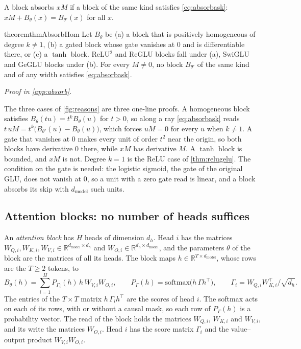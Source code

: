 \documentclass[10pt]{article}
\theoremstyle{definition}
\theoremstyle{remark}
\newcommand{\R}{\mathbb{R}}
\newcommand{\dm}{d_{\mathrm{model}}}
\newcommand{\proofin}[1]{\par\vspace{-0.4\baselineskip}\noindent\hfill{\small\itshape Proof in \cref{#1}.}\par\smallskip}
\begin{document}
A block absorbs $xM$ if a block of the same kind satisfies \eqref{eq:absorbask}: $xM + B_\theta(x) = B_{\theta'}(x)$ for all $x$.

\begin{restatable}{theorem}{thmAbsorbHom}\label{thm:homgated}
Let $B_\theta$ be (a) a block that is positively homogeneous of degree $k \neq 1$, (b) a gated block whose gate vanishes at $0$ and is differentiable there, or (c) a $\tanh$ block. ReLU$^2$ and ReGLU blocks fall under (a), SwiGLU and GeGLU blocks under (b). For every $M \neq 0$, no block $B_{\theta'}$ of the same kind and of any width satisfies \eqref{eq:absorbask}.
\end{restatable}
\proofin{app:absorb}

The three cases of \cref{fig:reasons} are three one-line proofs. A homogeneous block satisfies $B_\theta(tu) = t^kB_\theta(u)$ for $t > 0$, so along a ray \eqref{eq:absorbask} reads $t\,uM = t^k\big(B_{\theta'}(u) - B_\theta(u)\big)$, which forces $uM = 0$ for every $u$ when $k \neq 1$. A gate that vanishes at $0$ makes every unit of order $t^2$ near the origin, so both blocks have derivative $0$ there, while $xM$ has derivative $M$. A $\tanh$ block is bounded, and $xM$ is not. Degree $k = 1$ is the ReLU case of \cref{thm:relugelu}. The condition on the gate is needed: the logistic sigmoid, the gate of the original GLU, does not vanish at $0$, so a unit with a zero gate read is linear, and a block absorbs its skip with $\dm$ such units.

\subsection{Attention blocks: no number of heads suffices}\label{sec:attention}

An \emph{attention block} has $H$ heads of dimension $d_h$. Head $i$ has the matrices $W_{Q,i}, W_{K,i}, W_{V,i} \in \R^{\dm\times d_h}$ and $W_{O,i} \in \R^{d_h\times\dm}$, and the parameters $\theta$ of the block are the matrices of all its heads. The block maps $h \in \R^{T\times\dm}$, whose rows are the $T \ge 2$ tokens, to
\begin{equation}\label{eq:attn}
B_\theta(h) = \sum_{i=1}^{H} P_{\Gamma_i}(h)\, h\, W_{V,i} W_{O,i}, \qquad P_\Gamma(h) = \mathrm{softmax}\big(h\, \Gamma h^\top\big), \qquad \Gamma_i = W_{Q,i} W_{K,i}^\top/\sqrt{d_h}.
\end{equation}
The entries of the $T\times T$ matrix $h\,\Gamma_i h^\top$ are the scores of head $i$. The softmax acts on each of its rows, with or without a causal mask, so each row of $P_\Gamma(h)$ is a probability vector. The read of the block holds the matrices $W_{Q,i}$, $W_{K,i}$ and $W_{V,i}$, and its write the matrices $W_{O,i}$. Head $i$ has the score matrix $\Gamma_i$ and the value--output product $W_{V,i}W_{O,i}$.
\end{document}
